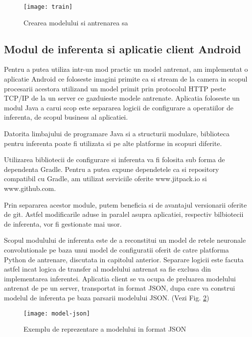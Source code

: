 	\begin{figure}[H]
		\texttt{[image: train]}
		\caption{\label{fig:train} Crearea modelului si antrenarea sa}
	\end{figure}
	
	\newpage
	\subsection{Modul de inferenta si aplicatie client Android}
	
	Pentru a putea utiliza intr-un mod practic un model antrenat, am implementat o aplicatie Android ce foloseste imagini primite ca si stream de la camera in scopul procesarii acestora utilizand un model primit prin protocolul HTTP peste TCP/IP de la un server ce gazduieste modele antrenate. 
	Aplicatia foloseste un modul Java a carui scop este separarea logicii de configurare a operatiilor de inferenta, de scopul business al aplicatiei. \newline
	
	Datorita limbajului de programare Java si a structurii modulare, biblioteca pentru inferenta poate fi utilizata si pe alte platforme in scopuri diferite.
	
	Utilizarea bibliotecii de configurare si inferenta va fi folosita sub forma de dependenta Gradle. Pentru a putea expune dependetele ca si repository compatibil cu Gradle, am utilizat serviciile oferite www.jitpack.io si www.github.com. 
	
	Prin separarea acestor module, putem beneficia si de avantajul versionarii oferite de git. Astfel modificarile aduse in paralel asupra aplicatiei, respectiv bilbiotecii de inferenta, vor fi gestionate mai usor.
	
	Scopul modulului de inferenta este de a reconstitui un model de retele neuronale convolutionale pe baza unui model de configuratii oferit de catre platforma Python de antrenare, discutata in capitolul anterior. Separare logicii este facuta astfel incat logica de transfer al modelului antrenat sa fie exclusa din implementarea inferentei. Aplicatia client se va ocupa de preluarea modelului antrenat de pe un server, transportat in format JSON, dupa care va construi modelul de inferenta pe baza parsarii modelului JSON. (Vezi Fig. \ref{fig:model-json})
	
	\vfill
	
	\begin{figure}[H]
		\texttt{[image: model-json]}
		\caption{\label{fig:model-json} Exemplu de reprezentare a modelului in format JSON}
	\end{figure}

